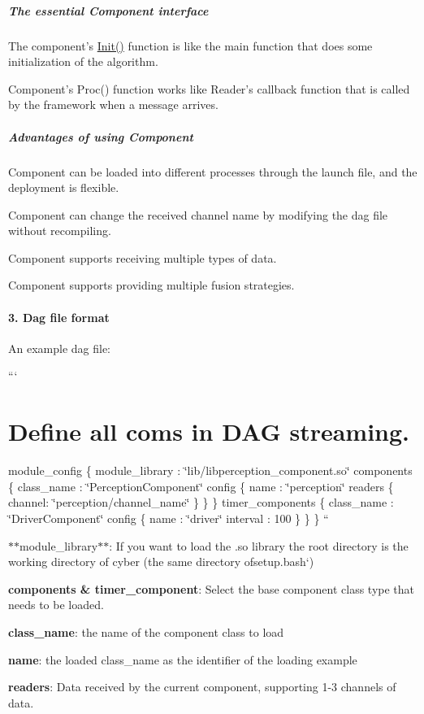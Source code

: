 \subparagraph*{The essential Component interface}


\begin{DoxyItemize}
\item The component's {\ttfamily \hyperlink{namespaceapollo_1_1cyber_a2d055a81b338116634deaf8ac3367aca}{Init()}} function is like the main function that does some initialization of the algorithm.
\item Component's {\ttfamily Proc()} function works like Reader's callback function that is called by the framework when a message arrives.
\end{DoxyItemize}

\subparagraph*{Advantages of using Component}


\begin{DoxyItemize}
\item Component can be loaded into different processes through the launch file, and the deployment is flexible.
\item Component can change the received channel name by modifying the dag file without recompiling.
\item Component supports receiving multiple types of data.
\item Component supports providing multiple fusion strategies.
\end{DoxyItemize}

\paragraph*{3. Dag file format}

An example dag file\-:

``` \section*{Define all coms in D\-A\-G streaming.}

module\-\_\-config \{ module\-\_\-library \-: \char`\"{}lib/libperception\-\_\-component.\-so\char`\"{} components \{ class\-\_\-name \-: \char`\"{}\-Perception\-Component\char`\"{} config \{ name \-: \char`\"{}perception\char`\"{} readers \{ channel\-: \char`\"{}perception/channel\-\_\-name\char`\"{} \} \} \} timer\-\_\-components \{ class\-\_\-name \-: \char`\"{}\-Driver\-Component\char`\"{} config \{ name \-: \char`\"{}driver\char`\"{} interval \-: 100 \} \} \} ``{\ttfamily 
\begin{DoxyItemize}
\item $\ast$$\ast$module\-\_\-library$\ast$$\ast$\-: If you want to load the .so library the root directory is the working directory of cyber (the same directory ofsetup.\-bash`)
\item {\bfseries components \& timer\-\_\-component}\-: Select the base component class type that needs to be loaded.
\item {\bfseries class\-\_\-name}\-: the name of the component class to load
\item {\bfseries name}\-: the loaded class\-\_\-name as the identifier of the loading example
\item {\bfseries readers}\-: Data received by the current component, supporting 1-\/3 channels of data.
\end{DoxyItemize}}

